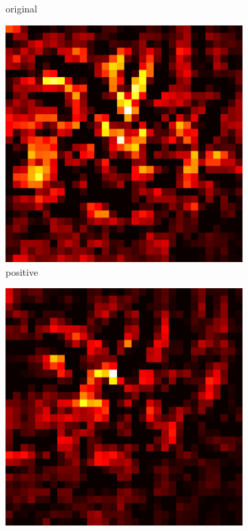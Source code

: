 \documentclass[preprint,12pt]{elsarticle}
\begin{document}
\begin{figure}
\begin{subfigure}{0.14\linewidth}
        \caption{original}
    \end{subfigure}
    \hfill
    \begin{subfigure}{0.14\textwidth}
        \centering
        \includegraphics[width=\linewidth]{../visualizations/examples/cifar10/cnn/positive_saliency_map/0.png}
        \caption{positive}
    \end{subfigure}
    \hfill
    \begin{subfigure}{0.14\textwidth}
        \centering
        \includegraphics[width=\linewidth]{../visualizations/examples/cifar10/cnn/negative_saliency_map/0.png}

\end{subfigure}
\end{figure}
\end{document}
